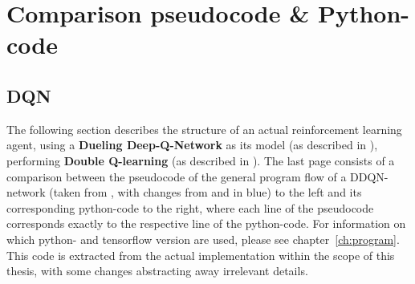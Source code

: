 




\chapter{Comparison pseudocode \& Python-code} %

\label{AppendixA} %

\vspace{-0.8cm}

\section{DQN}
\label{ap:dqn}

The following section describes the structure of an actual reinforcement learning agent, using a \textbf{Dueling Deep-Q-Network} as its model (as described in \cite{wang_dueling_2015}), performing \textbf{Double Q-learning} (as described in \cite{van_hasselt_deep_2015}). The last page consists of a comparison between the pseudocode of the general program flow of a DDQN-network (taken from \cite{mnih_human-level_2015}, with changes from \cite{van_hasselt_deep_2015} and \cite{lillicrap_continuous_2015} in blue) to the left and its corresponding python-code to the right, where each line of the pseudocode corresponds exactly to the respective line of the python-code. For information on which python- and tensorflow version are used, please see chapter~\ref{ch:program}. This code is extracted from the actual implementation within the scope of this thesis, with some changes abstracting away irrelevant details.\\

